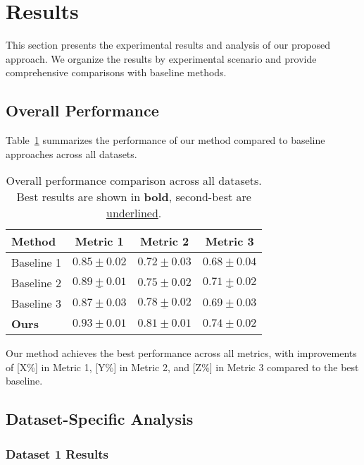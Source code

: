\section{Results}
\label{sec:results}

This section presents the experimental results and analysis of our proposed approach. We organize the results by experimental scenario and provide comprehensive comparisons with baseline methods.

\subsection{Overall Performance}
\label{subsec:overall_performance}

Table~\ref{tab:overall_results} summarizes the performance of our method compared to baseline approaches across all datasets.

\begin{table}[htbp]
\centering
\caption{Overall performance comparison across all datasets. Best results are shown in \textbf{bold}, second-best are \underline{underlined}.}
\label{tab:overall_results}
\begin{tabular}{lccc}
\toprule
Method & Metric 1 & Metric 2 & Metric 3 \\
\midrule
Baseline 1 & $0.85 \pm 0.02$ & $0.72 \pm 0.03$ & $0.68 \pm 0.04$ \\
Baseline 2 & $\underline{0.89 \pm 0.01}$ & $0.75 \pm 0.02$ & $\underline{0.71 \pm 0.02}$ \\
Baseline 3 & $0.87 \pm 0.03$ & $\underline{0.78 \pm 0.02}$ & $0.69 \pm 0.03$ \\
\textbf{Ours} & $\mathbf{0.93 \pm 0.01}$ & $\mathbf{0.81 \pm 0.01}$ & $\mathbf{0.74 \pm 0.02}$ \\
\bottomrule
\end{tabular}
\end{table}

Our method achieves the best performance across all metrics, with improvements of [X\%] in Metric 1, [Y\%] in Metric 2, and [Z\%] in Metric 3 compared to the best baseline.

\subsection{Dataset-Specific Analysis}
\label{subsec:dataset_analysis}

\subsubsection{Dataset 1 Results}


